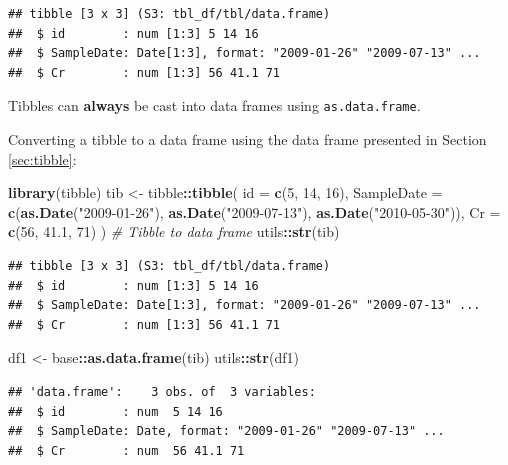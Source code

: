 \documentclass[
]{book}
\newenvironment{Shaded}{\begin{snugshade}}{\end{snugshade}}
\newcommand{\AttributeTok}[1]{\textcolor[rgb]{0.13,0.29,0.53}{#1}}
\newcommand{\CommentTok}[1]{\textcolor[rgb]{0.56,0.35,0.01}{\textit{#1}}}
\newcommand{\DecValTok}[1]{\textcolor[rgb]{0.00,0.00,0.81}{#1}}
\newcommand{\FloatTok}[1]{\textcolor[rgb]{0.00,0.00,0.81}{#1}}
\newcommand{\FunctionTok}[1]{\textcolor[rgb]{0.13,0.29,0.53}{\textbf{#1}}}
\newcommand{\NormalTok}[1]{#1}
\newcommand{\OtherTok}[1]{\textcolor[rgb]{0.56,0.35,0.01}{#1}}
\newcommand{\SpecialCharTok}[1]{\textcolor[rgb]{0.81,0.36,0.00}{\textbf{#1}}}
\newcommand{\StringTok}[1]{\textcolor[rgb]{0.31,0.60,0.02}{#1}}
\begin{document}
\begin{verbatim}
## tibble [3 x 3] (S3: tbl_df/tbl/data.frame)
##  $ id        : num [1:3] 5 14 16
##  $ SampleDate: Date[1:3], format: "2009-01-26" "2009-07-13" ...
##  $ Cr        : num [1:3] 56 41.1 71
\end{verbatim}

Tibbles can \textbf{always} be cast into data frames using \texttt{as.data.frame}.

Converting a tibble to a data frame using the data frame presented in Section \ref{sec:tibble}:

\begin{Shaded}
\begin{Highlighting}[]
\FunctionTok{library}\NormalTok{(tibble)}
\NormalTok{tib }\OtherTok{\textless{}{-}}\NormalTok{ tibble}\SpecialCharTok{::}\FunctionTok{tibble}\NormalTok{(}
    \AttributeTok{id =} \FunctionTok{c}\NormalTok{(}\DecValTok{5}\NormalTok{, }\DecValTok{14}\NormalTok{, }\DecValTok{16}\NormalTok{),}
    \AttributeTok{SampleDate =} \FunctionTok{c}\NormalTok{(}\FunctionTok{as.Date}\NormalTok{(}\StringTok{"2009{-}01{-}26"}\NormalTok{), }\FunctionTok{as.Date}\NormalTok{(}\StringTok{"2009{-}07{-}13"}\NormalTok{), }
            \FunctionTok{as.Date}\NormalTok{(}\StringTok{"2010{-}05{-}30"}\NormalTok{)),}
    \AttributeTok{Cr =} \FunctionTok{c}\NormalTok{(}\DecValTok{56}\NormalTok{, }\FloatTok{41.1}\NormalTok{, }\DecValTok{71}\NormalTok{)}
\NormalTok{)}
\CommentTok{\# Tibble to data frame}
\NormalTok{utils}\SpecialCharTok{::}\FunctionTok{str}\NormalTok{(tib)}
\end{Highlighting}
\end{Shaded}

\begin{verbatim}
## tibble [3 x 3] (S3: tbl_df/tbl/data.frame)
##  $ id        : num [1:3] 5 14 16
##  $ SampleDate: Date[1:3], format: "2009-01-26" "2009-07-13" ...
##  $ Cr        : num [1:3] 56 41.1 71
\end{verbatim}

\begin{Shaded}
\begin{Highlighting}[]
\NormalTok{df1 }\OtherTok{\textless{}{-}}\NormalTok{ base}\SpecialCharTok{::}\FunctionTok{as.data.frame}\NormalTok{(tib)}
\NormalTok{utils}\SpecialCharTok{::}\FunctionTok{str}\NormalTok{(df1)}
\end{Highlighting}
\end{Shaded}

\begin{verbatim}
## 'data.frame':    3 obs. of  3 variables:
##  $ id        : num  5 14 16
##  $ SampleDate: Date, format: "2009-01-26" "2009-07-13" ...
##  $ Cr        : num  56 41.1 71
\end{verbatim}
\end{document}
